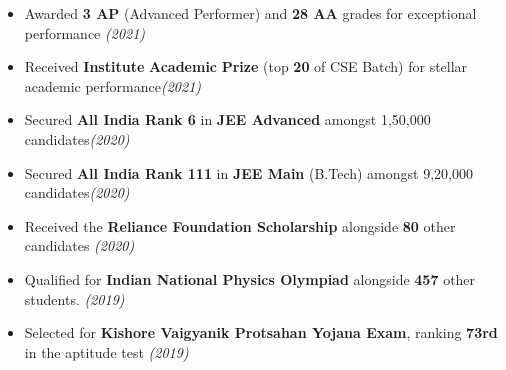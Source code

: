\begin{itemize}[itemsep = -1.3 mm, leftmargin=*]
\item Awarded {\bf 3 AP} (Advanced Performer) and {\bf 28 AA} grades for exceptional performance \hfill{\sl \small (2021)}
\item  Received {\bf Institute} {\bf Academic} {\bf Prize} (top {\bf 20} of CSE Batch) for stellar academic performance\hfill{\sl \small (2021)}
\item  Secured \textbf{All India Rank 6} in {\bf JEE Advanced} amongst 1,50,000 candidates\hfill{\sl \small (2020)}
\item  Secured \textbf{All India Rank 111} in {\bf JEE Main} (B.Tech) amongst 9,20,000 candidates\hfill{\sl \small (2020)}
\item Received the {\bf Reliance Foundation Scholarship} alongside {\bf 80} other candidates \hfill{\sl \small (2020)}
\item Qualified for {\bf Indian National Physics Olympiad} alongside {\bf 457} other students. \hfill{\sl \small (2019)}
\item Selected for {\bf Kishore Vaigyanik Protsahan Yojana Exam}, ranking {\bf 73rd} in the aptitude test \hfill{\sl \small (2019)}
\end{itemize}